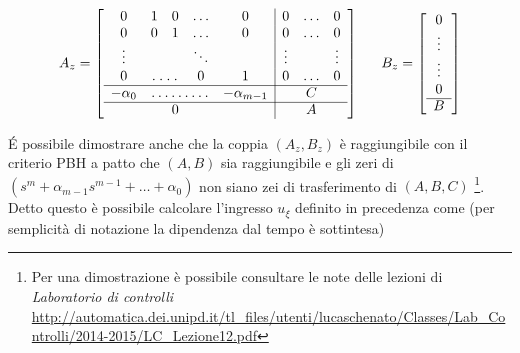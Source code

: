 	\begin{equation}
		A_z=
		\left[
		\begin{array}{ccccc|ccc}
			0         & 1     & 0     & \dots  & 0             & 0      & \dots & 0      \\
			0         & 0     & 1     & \dots  & 0             & 0      & \dots & 0      \\
			\vdots    &       &       & \ddots &               & \vdots &       & \vdots \\
			0         & \hdotsfor{2}  & 0      & 1             & 0      & \dots & 0      \\
			\cline{1-8}
			-\alpha_0 & \hdotsfor{3}           & -\alpha_{m-1} &        & C     &        \\
			\cline{1-8}
			          &       & 0     &        &               &        & A     &        \\
		\end{array}
		\right]
		\trippleSpacing
		B_z=
		\left[
		\begin{array}{c}
			0      \\
			\vdots \\
			\vdots \\
			0      \\
			\cline{1-1}
			B      \\
		\end{array}
		\right]	
	\end{equation}
	
	\noindent É possibile dimostrare anche che la coppia $(A_z, B_z)$ è raggiungibile con il criterio PBH a patto che $(A, B)$ sia raggiungibile e gli zeri di $(s^m+\alpha_{m-1}s^{m-1}+\dots+\alpha_0)$ non siano zei di trasferimento di $(A,B,C)$ \footnote{Per una dimostrazione è possibile consultare le note delle lezioni di \textit{Laboratorio di controlli} \url{http://automatica.dei.unipd.it/tl_files/utenti/lucaschenato/Classes/Lab_Controlli/2014-2015/LC_Lezione12.pdf}}. Detto questo è possibile calcolare l'ingresso $u_{\xi}$ definito in precedenza come (per semplicità di notazione la dipendenza dal tempo è sottintesa)
	
